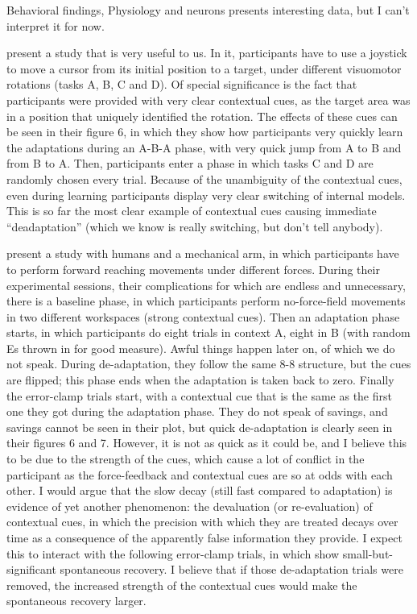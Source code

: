 \documentclass{report}
\begin{document}
\begin{chapter}{Behavioral findings, Physiology and neurons}
\cite{Huang_Persistence_2009} presents interesting data, but I can't interpret
it for now.

\cite{Lee_Dual_2009} present a study that is very useful to us. In it,
participants have to use a joystick to move a cursor from its initial position
to a target, under different visuomotor rotations (tasks A, B, C and D). Of
special significance is the fact that participants were provided with very
clear contextual cues, as the target area was in a position that uniquely
identified the rotation. The effects of these cues can be seen in their figure
6, in which they show how participants very quickly learn the adaptations
during an A-B-A phase, with very quick jump from A to B and from B to A. Then,
participants enter a phase in which tasks C and D are randomly chosen every
trial. Because of the unambiguity of the contextual cues, even during learning
participants display very clear switching of internal models. This is so far
the most clear example of contextual cues causing immediate ``deadaptation''
(which we know is really switching, but don't tell anybody).

\cite{Forano_Timescales_2020} present a study with humans and a mechanical arm,
in which participants have to perform forward reaching movements under
different forces. During their experimental sessions, their complications for
which are endless and unnecessary, there is a baseline phase, in which
participants perform no-force-field movements in two different workspaces
(strong contextual cues). Then an adaptation phase starts, in which
participants do eight trials in context A, eight in B (with random Es thrown in
for good measure). Awful things happen later on, of which we do not
speak. During de-adaptation, they follow the same 8-8 structure, but the cues
are flipped; this phase ends when the adaptation is taken back to zero. Finally
the error-clamp trials start, with a contextual cue that is the same as the
first one they got during the adaptation phase. They do not speak of savings,
and savings cannot be seen in their plot, but quick de-adaptation is clearly
seen in their figures 6 and 7. However, it is not as quick as it could be, and
I believe this to be due to the strength of the cues, which cause a lot of
conflict in the participant as the force-feedback and contextual cues are so at
odds with each other. I would argue that the slow decay (still fast compared to
adaptation) is evidence of yet another phenomenon: the devaluation (or
re-evaluation) of contextual cues, in which the precision with which they are
treated decays over time as a consequence of the apparently false information
they provide. I expect this to interact with the following error-clamp trials,
in which \cite{Forano_Timescales_2020} show small-but-significant spontaneous
recovery. I believe that if those de-adaptation trials were removed, the
increased strength of the contextual cues would make the spontaneous recovery
larger.


\end{chapter}
\end{document}
